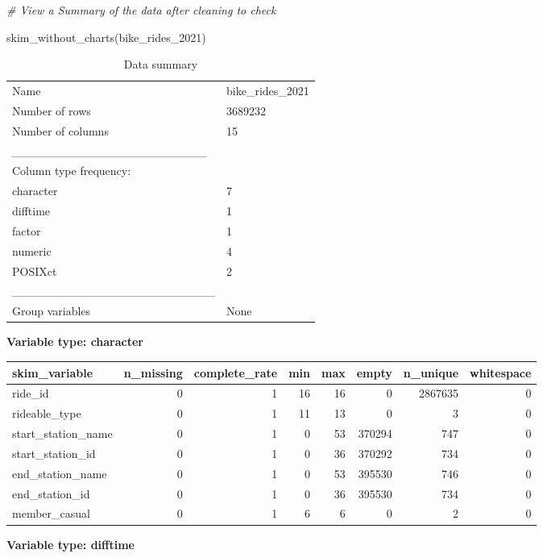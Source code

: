 \documentclass[
]{article}
\newenvironment{Shaded}{\begin{snugshade}}{\end{snugshade}}
\newcommand{\CommentTok}[1]{\textcolor[rgb]{0.56,0.35,0.01}{\textit{#1}}}
\newcommand{\FunctionTok}[1]{\textcolor[rgb]{0.00,0.00,0.00}{#1}}
\newcommand{\NormalTok}[1]{#1}
\begin{document}
\begin{Shaded}
\begin{Highlighting}[]
\CommentTok{\# View a Summary of the data after cleaning to check }

\FunctionTok{skim\_without\_charts}\NormalTok{(bike\_rides\_2021)}
\end{Highlighting}
\end{Shaded}

\begin{longtable}[]{@{}ll@{}}
\caption{Data summary}\tabularnewline
\toprule
\endhead
Name & bike\_rides\_2021 \\
Number of rows & 3689232 \\
Number of columns & 15 \\
\_\_\_\_\_\_\_\_\_\_\_\_\_\_\_\_\_\_\_\_\_\_\_ & \\
Column type frequency: & \\
character & 7 \\
difftime & 1 \\
factor & 1 \\
numeric & 4 \\
POSIXct & 2 \\
\_\_\_\_\_\_\_\_\_\_\_\_\_\_\_\_\_\_\_\_\_\_\_\_ & \\
Group variables & None \\
\bottomrule
\end{longtable}

\textbf{Variable type: character}

\begin{longtable}[]{@{}lrrrrrrr@{}}
\toprule
skim\_variable & n\_missing & complete\_rate & min & max & empty &
n\_unique & whitespace \\
\midrule
\endhead
ride\_id & 0 & 1 & 16 & 16 & 0 & 2867635 & 0 \\
rideable\_type & 0 & 1 & 11 & 13 & 0 & 3 & 0 \\
start\_station\_name & 0 & 1 & 0 & 53 & 370294 & 747 & 0 \\
start\_station\_id & 0 & 1 & 0 & 36 & 370292 & 734 & 0 \\
end\_station\_name & 0 & 1 & 0 & 53 & 395530 & 746 & 0 \\
end\_station\_id & 0 & 1 & 0 & 36 & 395530 & 734 & 0 \\
member\_casual & 0 & 1 & 6 & 6 & 0 & 2 & 0 \\
\bottomrule
\end{longtable}

\textbf{Variable type: difftime}
\end{document}
